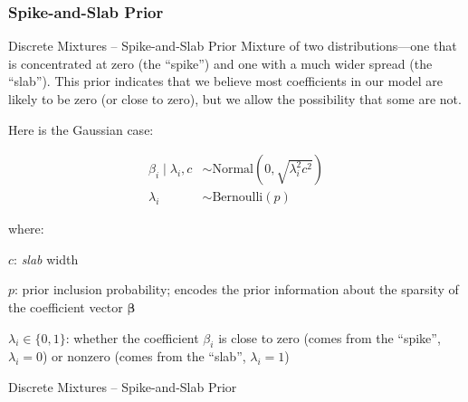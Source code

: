 \subsubsection{Spike-and-Slab Prior}
\begin{frame}{Discrete Mixtures -- Spike-and-Slab Prior}
    \small
    Mixture of two distributions—one that is
    concentrated at zero (the ``spike'') and one with a much wider spread (the
    ``slab''). This prior indicates that we believe most coefficients in our model are
    likely to be zero (or close to zero), but we allow the possibility that some are
    not.

    \vfill 
    Here is the Gaussian case:

    $$
        \begin{aligned}
            \beta_i \mid \lambda_i, c &\sim \text{Normal} \left( 0, \sqrt{\lambda_i^2 c^2} \right) \\
            \lambda_i &\sim \text{Bernoulli} (p)
        \end{aligned}
    $$

    where:
    \begin{vfilleditems}
        \small
        \item $c$: \textit{slab} width
        \item $p$: prior inclusion probability;
            encodes the prior information about the sparsity of the
            coefficient vector $\boldsymbol{\beta}$
        \item $\lambda_i \in \{0, 1\}$: whether the coefficient $\beta_i$ is close
            to zero (comes from the ``spike'', $\lambda_i = 0$) or nonzero
            (comes from the ``slab'', $\lambda_i = 1$)
    \end{vfilleditems}
\end{frame}

\begin{frame}{Discrete Mixtures -- Spike-and-Slab Prior}
	\centering
\end{frame}

